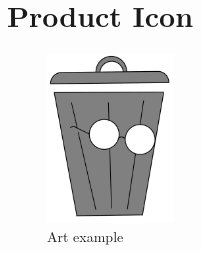 \documentclass[a4paper]{scrreprt}
\begin{document}
\section{Product Icon}
\begin{figure}[h]
\centering
\includegraphics[width=0.3\textwidth]{../graphical/logo_draft_color.png}
\caption{\label{fig:art2} Art example}
\end{figure}



\end{document}

